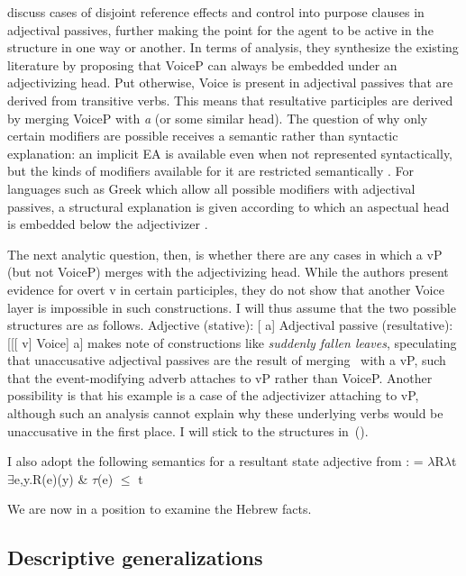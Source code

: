 \cite{alexiadouetal14} discuss cases of disjoint reference effects and control into purpose clauses in adjectival passives, further making the point for the agent to be active in the structure in one way or another. In terms of analysis, they synthesize the existing literature by proposing that VoiceP can always be embedded under an adjectivizing head. Put otherwise, Voice is present in adjectival passives that are derived from transitive verbs. This means that resultative participles are derived by merging VoiceP with \emph{a} (or some similar head). The question of why only certain modifiers are possible receives a semantic rather than syntactic explanation: an implicit EA is available even when not represented syntactically, but the kinds of modifiers available for it are restricted semantically \citep{bhattpancheva06}. For languages such as Greek which allow all possible modifiers with adjectival passives, a structural explanation is given according to which an aspectual head is embedded below the adjectivizer \citep{anagnostopoulou03,alexiadouetal14}.

The next analytic question, then, is whether there are any cases in which a vP (but not VoiceP) merges with the adjectivizing head. While the authors present evidence for overt v in certain participles, they do not show that another Voice layer is impossible in such constructions. I will thus assume that the two possible structures are as follows.
\pex
	\a Adjective (stative): {[} a]
	\a Adjectival passive (resultative): {[}[[ v] Voice] a]
\xe
\citet[391]{bruening14nllt} makes note of constructions like \emph{suddenly fallen leaves}, speculating that unaccusative adjectival passives are the result of merging \vz~with a vP, such that the event-modifying adverb attaches to vP rather than VoiceP. Another possibility is that his example is a case of the adjectivizer attaching to vP, although such an analysis cannot explain why these underlying verbs would be unaccusative in the first place. I will stick to the structures in~(\lastx).

I also adopt the following semantics for a resultant state adjective from \cite{kratzer00bls}:
\ex {} = $\lambda$R$\lambda$t$\exists$e,y.R(e)(y) \& $\tau$(e) $\le$ t
\xe

We are now in a position to examine the Hebrew facts.

	\subsection{Descriptive generalizations} \label{passn:adjpass:mpua}

